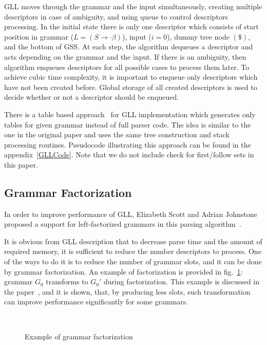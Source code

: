\documentclass[runningheads,a4paper]{llncs}
\begin{document}
GLL moves through the grammar and the input simultaneously, creating multiple descriptors in case of ambiguity, and using queue to control descriptors processing.
In the initial state there is only one descriptor which consists of start position in grammar
($L = (S \to \cdot \beta)$), input ($i=0$), dummy tree node $ (\$) $, and the bottom of GSS.
At each step, the algorithm dequeues a descriptor and acts depending on the grammar and the input.
If there is an ambiguity, then algorithm enqueues descriptors for all possible cases to process them later. 
To achieve cubic time complexity, it is important to enqueue only descriptors which have not been created before.
Global storage of all created descriptors is used to decide whether or not a descriptor should be enqueued.

There is a table based approach~\cite{ragozina} for GLL implementation which generates only tables for given grammar instead of full parser code.
The idea is similar to the one in the original paper and uses the same tree construction and stack processing routines.
Pseudocode illustrating this approach can be found in the appendix~\ref{GLLCode}.
Note that we do not include check for first/follow sets in this paper.


\subsection{Grammar Factorization}%

In order to improve performance of GLL, Elizabeth Scott and Adrian Johnstone proposed a support for left-factorized grammars in this parsing algorithm~\cite{scott2016structuring}. 

It is obvious from GLL description that to decrease parse time and the amount of required memory, it is sufficient to reduce the number descriptors to process.
One of the ways to do it is to reduce the number of grammar slots, and it can be done by grammar factorization.
An example of factorization is provided in fig.~\ref{fig:ExampleOfFactorization}: grammar $G_0$ transforms to $G_0'$ during factorization.
This example is discussed in the paper~\cite{scott2016structuring}, and it is shown, that, by producing less slots, such transformation can improve performance significantly for some grammars.

\begin{figure}
    \centering
    ~
    \caption{Example of grammar factorization}
    \label{fig:ExampleOfFactorization}
\end{figure}
\end{document}
